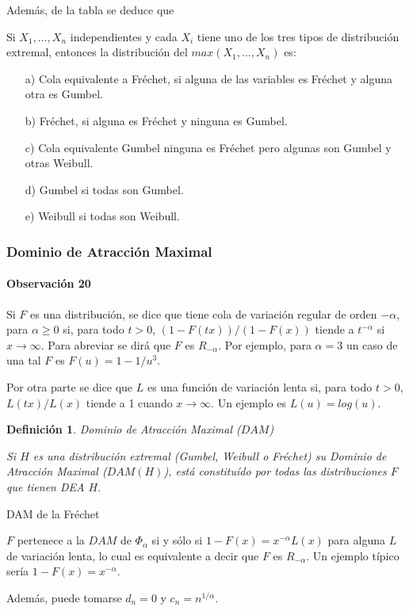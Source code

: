 \documentclass[
  12pt]{article}
\newtheorem{definition}{Definición}[section]
\begin{document}
Además, de la tabla se deduce que

\begin{theorem}
Si $X_1,...,X_n$ independientes y cada $X_i$ tiene uno de los tres tipos de distribución extremal, entonces la distribución del $max(X_1,...,X_n)$ es:
\begin{itemize}
\item[a)] Cola equivalente a Fréchet, si alguna de las variables es Fréchet y alguna otra es Gumbel.
\item[b)]  Fréchet, si alguna es Fréchet y ninguna es Gumbel.
\item[c)]  Cola equivalente Gumbel ninguna es Fréchet pero algunas son Gumbel y otras Weibull.
\item[d)] Gumbel si todas son Gumbel.
\item[e)]  Weibull si todas son Weibull.
\end{itemize}
\end{theorem}

\subsubsection*{Dominio de Atracción Maximal}

\paragraph*{Observación 20}

Si \(F\) es una distribución, se dice que tiene cola de variación
regular de orden \(-\alpha\), para \(\alpha \geq 0\) si, para todo
\(t>0\), \((1-F(tx))/(1-F(x))\) tiende a \(t^{-\alpha}\) si
\(x \rightarrow \infty\). Para abreviar se dirá que \(F\) es
\(R_{-\alpha}\). Por ejemplo, para \(\alpha=3\) un caso de una tal \(F\)
es \(F(u)=1- 1/u^3\).

Por otra parte se dice que \(L\) es una función de variación lenta si,
para todo \(t>0\), \(L(tx)/L(x)\) tiende a 1 cuando
\(x \rightarrow \infty\). Un ejemplo es \(L(u)=log(u)\).

\begin{definition} Dominio de Atracción Maximal ($DAM$)

Si $H$ es una distribución extremal (Gumbel, Weibull o Fréchet) su Dominio de Atracción Maximal ($DAM(H)$), está constituído por todas las distribuciones $F$ que tienen DEA $H$.
\end{definition}

\begin{theorem} DAM de la Fréchet

$F$ pertenece a la $DAM$ de $\Phi_{\alpha}$ si y sólo si
$1-F(x)=x^{-\alpha} L(x)$ para alguna $L$ de variación lenta,
lo cual es equivalente a decir que $F$ es $R_{-\alpha}$. Un ejemplo típico sería $1-F(x)= x^{-\alpha}$.

Además, puede tomarse $d_n=0$ y $c_n= n^{1/\alpha}$.
\end{theorem}
\end{document}
